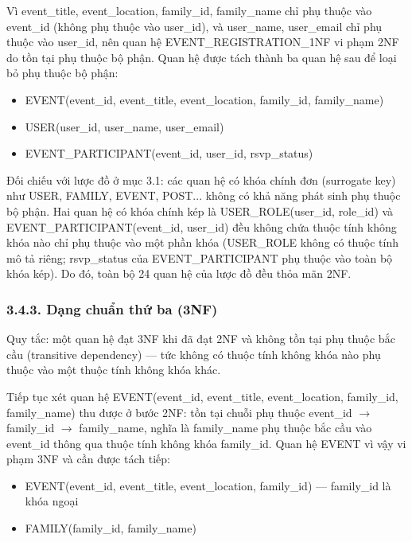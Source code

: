 Vì event\_title, event\_location, family\_id, family\_name chỉ phụ thuộc vào event\_id (không phụ thuộc vào user\_id), và user\_name, user\_email chỉ phụ thuộc vào user\_id, nên quan hệ EVENT\_REGISTRATION\_1NF vi phạm 2NF do tồn tại phụ thuộc bộ phận. Quan hệ được tách thành ba quan hệ sau để loại bỏ phụ thuộc bộ phận:

\begin{itemize}
	\item EVENT(event\_id, event\_title, event\_location, family\_id, family\_name)
	\item USER(user\_id, user\_name, user\_email)
	\item EVENT\_PARTICIPANT(event\_id, user\_id, rsvp\_status)
\end{itemize}

Đối chiếu với lược đồ ở mục 3.1: các quan hệ có khóa chính đơn (surrogate key) như USER, FAMILY, EVENT, POST... không có khả năng phát sinh phụ thuộc bộ phận. Hai quan hệ có khóa chính kép là USER\_ROLE(user\_id, role\_id) và EVENT\_PARTICIPANT(event\_id, user\_id) đều không chứa thuộc tính không khóa nào chỉ phụ thuộc vào một phần khóa (USER\_ROLE không có thuộc tính mô tả riêng; rsvp\_status của EVENT\_PARTICIPANT phụ thuộc vào toàn bộ khóa kép). Do đó, toàn bộ 24 quan hệ của lược đồ đều thỏa mãn 2NF.

\subsubsection{3.4.3. Dạng chuẩn thứ ba (3NF)}

Quy tắc: một quan hệ đạt 3NF khi đã đạt 2NF và không tồn tại phụ thuộc bắc cầu (transitive dependency) --- tức không có thuộc tính không khóa nào phụ thuộc vào một thuộc tính không khóa khác.

Tiếp tục xét quan hệ EVENT(event\_id, event\_title, event\_location, family\_id, family\_name) thu được ở bước 2NF: tồn tại chuỗi phụ thuộc event\_id $\rightarrow$ family\_id $\rightarrow$ family\_name, nghĩa là family\_name phụ thuộc bắc cầu vào event\_id thông qua thuộc tính không khóa family\_id. Quan hệ EVENT vì vậy vi phạm 3NF và cần được tách tiếp:

\begin{itemize}
	\item EVENT(event\_id, event\_title, event\_location, family\_id) --- family\_id là khóa ngoại
	\item FAMILY(family\_id, family\_name)
\end{itemize}

